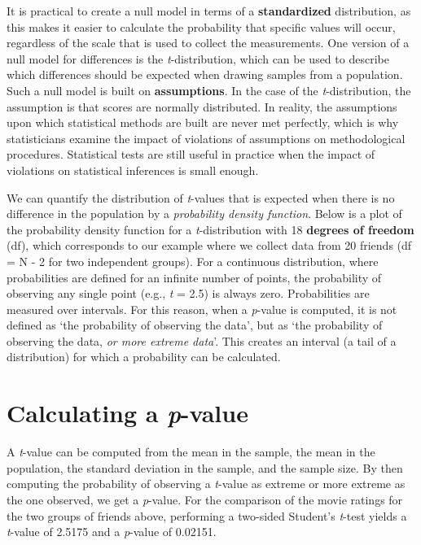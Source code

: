 \documentclass[
  oneside]{krantz}
\begin{document}
It is practical to create a null model in terms of a \textbf{standardized} distribution, as this makes it easier to calculate the probability that specific values will occur, regardless of the scale that is used to collect the measurements. One version of a null model for differences is the \emph{t}-distribution, which can be used to describe which differences should be expected when drawing samples from a population. Such a null model is built on \textbf{assumptions}. In the case of the \emph{t}-distribution, the assumption is that scores are normally distributed. In reality, the assumptions upon which statistical methods are built are never met perfectly, which is why statisticians examine the impact of violations of assumptions on methodological procedures. Statistical tests are still useful in practice when the impact of violations on statistical inferences is small enough.

We can quantify the distribution of \emph{t}-values that is expected when there is no difference in the population by a \emph{probability density function}. Below is a plot of the probability density function for a \emph{t}-distribution with 18 \textbf{degrees of freedom} (df), which corresponds to our example where we collect data from 20 friends (df = N - 2 for two independent groups). For a continuous distribution, where probabilities are defined for an infinite number of points, the probability of observing any single point (e.g., \emph{t} = 2.5) is always zero. Probabilities are measured over intervals. For this reason, when a \emph{p}-value is computed, it is not defined as `the probability of observing the data', but as `the probability of observing the data, \emph{or more extreme data}'. This creates an interval (a tail of a distribution) for which a probability can be calculated.

\hypertarget{calculating-a-p-value}{%
\section{\texorpdfstring{Calculating a \emph{p}-value}{Calculating a p-value}}\label{calculating-a-p-value}}

A \emph{t}-value can be computed from the mean in the sample, the mean in the population, the standard deviation in the sample, and the sample size. By then computing the probability of observing a \emph{t}-value as extreme or more extreme as the one observed, we get a \emph{p}-value. For the comparison of the movie ratings for the two groups of friends above, performing a two-sided Student's \emph{t}-test yields a \emph{t}-value of 2.5175 and a \emph{p}-value of 0.02151.
\end{document}
